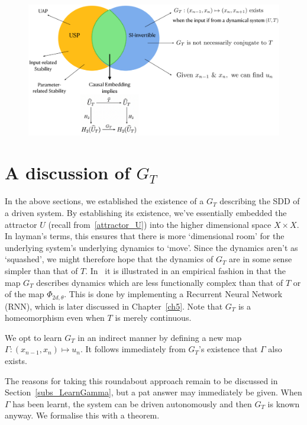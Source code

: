 \begin{figure}[ht]
  \includegraphics[scale=0.3]{Graphs/_summarypictorial.eps}
  \centering
\label{fig:pictorialSummary}
\end{figure}

\section{A discussion of $G_T$ }

In the above sections, we established the existence of a $G_T$ describing the SDD of a driven system. By establishing its existence, we’ve essentially embedded the attractor $U$ (recall from~\ref{attractor_U}) into the higher dimensional space $X\times{X}$.
In layman’s terms, this ensures that there is more `dimensional room' for the underlying system’s underlying dynamics to `move'. Since the dynamics aren’t as `squashed', we might therefore hope that the dynamics of $G_T$ are in some sense simpler than that of $T$. 
In~\cite{manjunath2021universal} it is illustrated in an empirical fashion in that the map $G_T$ describes dynamics which are less functionally complex than that of $T$ or of the map $\Phi_{2d,\theta}$. This is done by implementing a Recurrent Neural Network (RNN), which is later discussed in Chapter~\ref{ch5}.
Note that $G_T$ is a homeomorphism even when $T$ is merely continuous. 

We opt to learn $G_T$ in an indirect manner by defining a new map $\Gamma:(x_{n-1},x_n)\mapsto{u_n}$. It follows immediately from $G_T$’s existence that $\Gamma$ also exists. 

The reasons for taking this roundabout approach remain to be discussed in Section~\ref{subs_LearnGamma}, but a pat answer may immediately be given. When $\Gamma$ has been learnt, the system can be driven autonomously and then $G_T$ is known anyway. We formalise this with a theorem.

